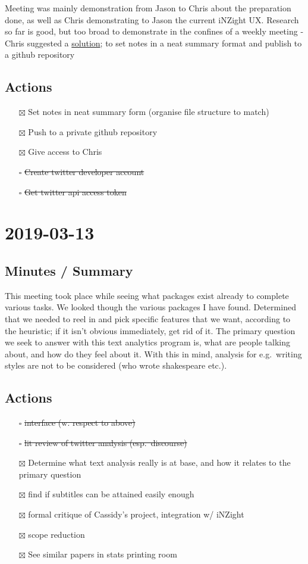 \documentclass[11pt]{article}
\begin{document}
Meeting was mainly demonstration from Jason to Chris about the
preparation done, as well as Chris demonstrating to Jason the current
iNZight UX. Research so far is good, but too broad to demonstrate in the
confines of a weekly meeting - Chris suggested a \hyperref[sec:org969fe61]{solution};
to set notes in a neat summary format and publish to a github repository

\subsection{Actions}
\label{sec:org969fe61}
\begin{itemize}
\item[{$\boxtimes$}] Set notes in neat summary form (organise file structure to match)
\item[{$\boxtimes$}] Push to a private github repository
\item[{$\boxtimes$}] Give access to Chris
\item[{$\square$}] \sout{Create twitter developer account}
\item[{$\square$}] \sout{Get twitter api access token}
\end{itemize}

\section{2019-03-13}
\label{sec:org8edee7b}
\subsection{Minutes / Summary}
\label{sec:org61a6b2d}
This meeting took place while seeing what packages exist already to
complete various tasks. We looked though the various packages I have
found. Determined that we needed to reel in and pick specific features
that we want, according to the heuristic; if it isn't obvious
immediately, get rid of it. The primary question we seek to answer with
this text analytics program is, what are people talking about, and how
do they feel about it. With this in mind, analysis for e.g. writing
styles are not to be considered (who wrote shakespeare etc.).


\subsection{Actions}
\label{sec:org28cf0d8}
\begin{itemize}
\item[{$\square$}] \sout{interface (w. respect to above)}
\item[{$\square$}] \sout{lit review of twitter analysis (esp. discourse)}
\item[{$\boxtimes$}] Determine what text analysis really is at base, and how it relates
to the primary question
\item[{$\boxtimes$}] find if subtitles can be attained easily enough
\item[{$\boxtimes$}] formal critique of Cassidy's project, integration w/ iNZight
\item[{$\boxtimes$}] scope reduction
\item[{$\boxtimes$}] See similar papers in stats printing room
\end{itemize}
\end{document}
